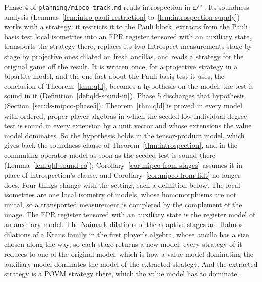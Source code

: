 Phase 4 of \texttt{planning/mipco-track.md} reads introspection in $\omega^{\mathrm{co}}$. Its soundness
analysis (Lemmas~\ref{lem:intro-pauli-restriction} to~\ref{lem:introspection-supply}) works with a
strategy: it restricts it to the Pauli block, extracts from the Pauli basis test local isometries
into an EPR register tensored with an auxiliary state, transports the strategy there, replaces its
two Introspect measurements stage by stage by projective ones dilated on fresh ancillas, and reads a
strategy for the original game off the result. It is written once, for a projective strategy in a
bipartite model, and the one fact about the Pauli basis test it uses, the conclusion of
Theorem~\ref{thm:qld}, becomes a hypothesis on the model: the test is sound in it
(Definition~\ref{def:qld-sound-in}). Phase 5 discharges that hypothesis
(Section~\ref{sec:ds-mipco-phase5}): Theorem~\ref{thm:qld} is proved in every model with ordered,
proper player algebras in which the seeded low-individual-degree test is sound in every extension by
a unit vector and whose extensions the value model dominates. So the hypothesis holds in the
tensor-product model, which gives back the soundness clause of Theorem~\ref{thm:introspection}, and
in the commuting-operator model as soon as the seeded test is sound there
(Lemma~\ref{lem:qld-sound-co}); Corollary~\ref{cor:mipco-from-stages} assumes it in place of
introspection's clause, and Corollary~\ref{cor:mipco-from-lidt} no longer does. Four things change
with the setting, each a definition below. The local isometries are one local isometry of models,
whose homomorphisms are not unital, so a transported measurement is completed by the complement of
the image. The EPR register tensored with an auxiliary state is the register model of an auxiliary
model. The Naimark dilations of the adaptive stages are Halmos dilations of a Kraus family in the
first player's algebra, whose ancilla has a size chosen along the way, so each stage returns a new
model; every strategy of it reduces to one of the original model, which is how a value model
dominating the auxiliary model dominates the model of the extracted strategy. And the extracted
strategy is a POVM strategy there, which the value model has to dominate.

